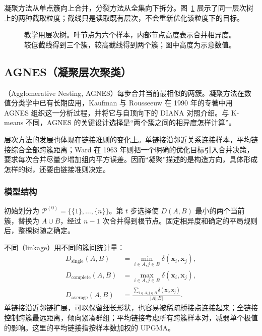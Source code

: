 凝聚方法从单点簇向上合并，分裂方法从全集向下拆分。图~\ref{fig:clustering-dendrogram} 展示了同一层次树上的两种截取粒度；截线只是读取既有层次，不会重新优化该粒度下的目标。

\begin{figure}[htbp]
 \centering
 
 \caption{教学用层次树。叶节点为六个样本，内部节点高度表示合并相异度。较低截线得到三个簇，较高截线得到两个簇；图中高度为示意数值。}
 \label{fig:clustering-dendrogram}
\end{figure}

\subsection{AGNES（凝聚层次聚类）}
\label{sec:clustering-agnes}

（Agglomerative Nesting, AGNES）每步合并当前最相似的两簇。凝聚方法在数值分类学中已有长期应用，Kaufman 与 Rousseeuw 在 1990 年的专著中用 AGNES 组织这一分析过程，并将它与自顶向下的 DIANA 对照介绍。与 K-means 不同，AGNES 的关键设计选择是“两个簇之间的相异度怎样计算”。

层次方法的发展也体现在链接准则的变化上。单链接沿邻近关系连接样本，平均链接综合全部跨簇距离；Ward 在 1963 年则把一个明确的优化目标引入合并决策，要求每次合并尽量少增加组内平方误差。因而“凝聚”描述的是构造方向，具体形成怎样的树，还要由链接准则决定。

\subsubsection{模型结构}

初始划分为 $\mathcal{P}^{(0)}=\{\{1\},\ldots,\{n\}\}$。第 $t$ 步选择使 $D(A,B)$ 最小的两个当前簇，替换为 $A\cup B$，经过 $n-1$ 次合并得到根节点。固定相异度和确定的平局规则后，整棵树随之确定。

不同（linkage）用不同的簇间统计量：
\begin{align*}
 D_{\mathrm{single}}(A,B)
   &=\min_{i\in A,j\in B}\delta(\bm{x}_i,\bm{x}_j),\\
 D_{\mathrm{complete}}(A,B)
   &=\max_{i\in A,j\in B}\delta(\bm{x}_i,\bm{x}_j),\\
 D_{\mathrm{average}}(A,B)
   &=\frac{\sum_{i\in A,j\in B}\delta(\bm{x}_i,\bm{x}_j)}
   {|A||B|}.
\end{align*}
单链接沿近邻链扩展，可以保留细长形状，也容易被稀疏桥接点连接起来；全链接控制跨簇最远距离，倾向紧凑群组；平均链接考虑所有跨簇样本对，减弱单个极值的影响。这里的平均链接指按样本数加权的 UPGMA。


